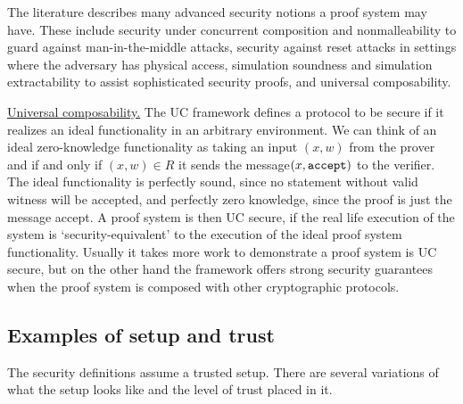 The literature describes many advanced security notions a proof system may have.
These include security under concurrent composition and nonmalleability to guard against man-in-the-middle attacks, security against reset attacks in settings where the adversary has physical access, simulation soundness and simulation extractability to assist sophisticated security proofs, and universal composability.
 
\underline{Universal composability.} The UC framework defines a protocol to be secure if it realizes an ideal functionality in an arbitrary environment. We can think of an ideal zero-knowledge functionality as taking an input $(x,w)$ from the prover and if and only if $(x,w) \in R$ it sends the message$ (x, \tt accept)$ to the verifier. The ideal functionality is perfectly sound, since no statement without valid witness will be accepted, and perfectly zero knowledge, since the proof is just the message accept. A proof system is then UC secure, if the real life execution of the system is `security-equivalent’ to the execution of the ideal proof system functionality. Usually it takes more work to demonstrate a proof system is UC secure, but on the other hand the framework offers strong security guarantees when the proof system is composed with other cryptographic protocols.


\subsection{Examples of setup and trust}
\label{sec:security:defs-props:examples-of-setup-and-trust}

The security definitions assume a trusted setup. There are several variations of what the setup looks like and the level of trust placed in it.

